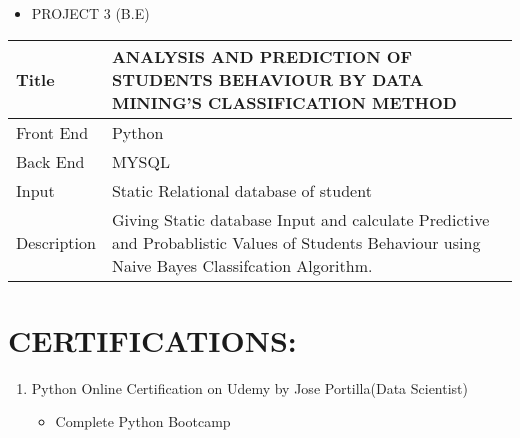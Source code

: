 \documentclass[a4paper,10pt]{article}
\begin{document}
 
 
 
 
 
 
 
 
 
 
 
 \newpage
 \begin{itemize}
   \item {\large PROJECT 3 (B.E)}
   
 \end{itemize}
\begin{tabu} to 0.9\textwidth { | X[l] | X[2.5] | }
 \hline
 \large Title & ANALYSIS AND PREDICTION OF
STUDENTS BEHAVIOUR BY DATA
MINING'S CLASSIFICATION METHOD\\
 
 \hline
\large Front End  & Python\\
 
 \hline
 \large Back End    & MYSQL \\
 
 \hline
\large Input  & Static Relational database of student   \\
 
 \hline
\large Description & Giving Static database Input and calculate Predictive  and Probablistic Values of Students Behaviour using Naive Bayes Classifcation Algorithm. \\
 
 
\hline
\end{tabu}




















\section{CERTIFICATIONS:}
\begin{enumerate}
   
    \item Python Online Certification on Udemy by Jose Portilla(Data Scientist)
   
   \begin{itemize}
     \item Complete Python Bootcamp

      \end{itemize}  
\end{enumerate}
\end{document}
